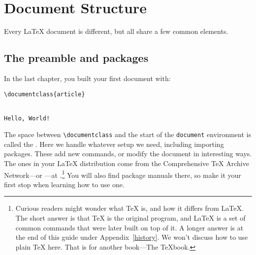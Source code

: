 \chapter{Document Structure}
\label{structure}

Every \LaTeX{} document is different,
but all share a few common elements.

\section{The preamble and packages}
In the last chapter, you built your first document with:
\begin{leftfigure}
\begin{lstlisting}
\documentclass{article}


Hello, World!

\end{lstlisting}
\end{leftfigure}
The space between \verb|\documentclass| and the start of the
\texttt{document} environment is called the .
Here we handle whatever setup we need, including importing packages.
These add new commands, or modify the document in interesting ways.
The ones in your \LaTeX{} distribution come from the Comprehensive \TeX{}
Archive Network---or ---at .\punckern\footnote{%
Curious readers might wonder what \TeX{} is, and how it differs from \LaTeX.
The short answer is that \TeX{} is the original program, and \LaTeX{}
is a set of common commands that were later built on top of it.
A longer answer is at the end of this guide under Appendix~\ref{history}.
We won't discuss how to use plain \TeX{} here. That is for another book---The
\TeX book.}
You will also find package manuals there,
so make it your first stop when learning how to use one.

